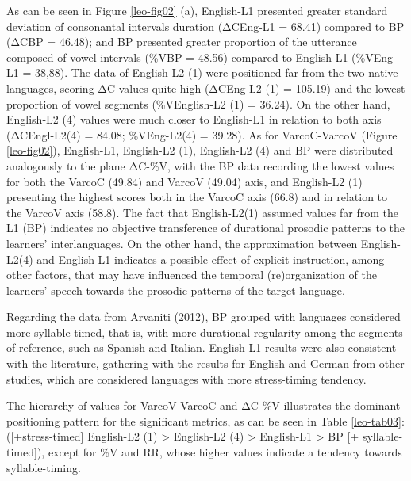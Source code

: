 As can be seen in Figure \ref{leo-fig02} (a), English-L1 presented greater standard deviation
of consonantal intervals duration (ΔCEng-L1 = 68.41) compared to BP (ΔCBP =
46.48); and BP presented greater proportion of the utterance composed of vowel
intervals (\%VBP = 48.56) compared to English-L1 (\%VEng-L1 = 38,88). The data
of English-L2 (1) were positioned far from the two native languages, scoring ΔC
values quite high (ΔCEng-L2 (1) = 105.19) and the lowest proportion of vowel
segments (\%VEnglish-L2 (1) = 36.24). On the other hand, English-L2 (4) values
were much closer to English-L1 in relation to both axis (ΔCEngl-L2(4) = 84.08;
\%VEng-L2(4) = 39.28). As for VarcoC-VarcoV (Figure \ref{leo-fig02}),
English-L1, English-L2 (1), English-L2 (4) and BP were distributed analogously
to the plane ΔC-\%V, with the BP data recording the lowest values for both the
VarcoC (49.84) and VarcoV (49.04) axis, and English-L2 (1) presenting the
highest scores both in the VarcoC axis (66.8) and in relation to the VarcoV
axis (58.8). The fact that English-L2(1) assumed values far from the L1 (BP)
indicates no objective transference of durational prosodic patterns to the
learners’ interlanguages. On the other hand, the approximation between
English-L2(4) and English-L1 indicates a possible effect of explicit
instruction, among other factors, that may have influenced the temporal
(re)organization of the learners’ speech towards the prosodic patterns of the
target language. 

Regarding the data from Arvaniti (2012), BP grouped with languages considered
more syllable-timed, that is, with more durational regularity among the
segments of reference, such as Spanish and Italian. English-L1 results were
also consistent with the literature, gathering with the results for English and
German from other studies, which are considered languages with more
stress-timing tendency. 

The hierarchy of values for VarcoV-VarcoC and ΔC-\%V illustrates the dominant
positioning pattern for the significant metrics, as can be seen in Table \ref{leo-tab03}:
([+stress-timed] English-L2 (1) > English-L2 (4) > English-L1 > BP [+
syllable-timed]), except for \%V and RR, whose higher values indicate a
tendency towards syllable-timing.

